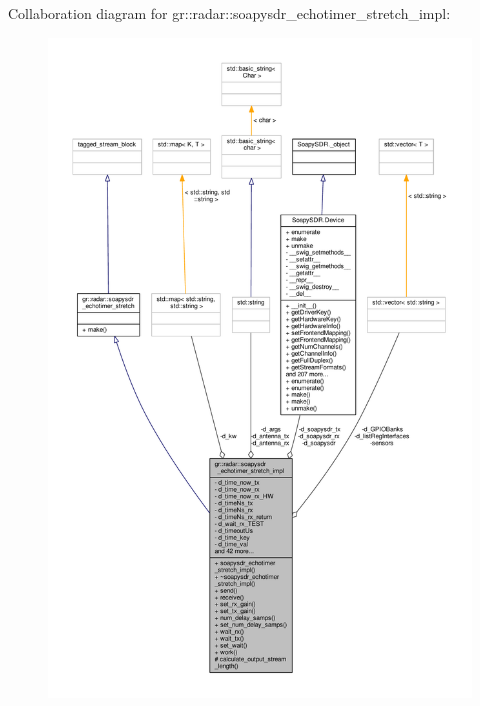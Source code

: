 Collaboration diagram for gr\+:\+:radar\+:\+:soapysdr\+\_\+echotimer\+\_\+stretch\+\_\+impl\+:
\nopagebreak
\begin{figure}[H]
\begin{center}
\leavevmode
\includegraphics[width=350pt]{da/d11/classgr_1_1radar_1_1soapysdr__echotimer__stretch__impl__coll__graph}
\end{center}
\end{figure}
